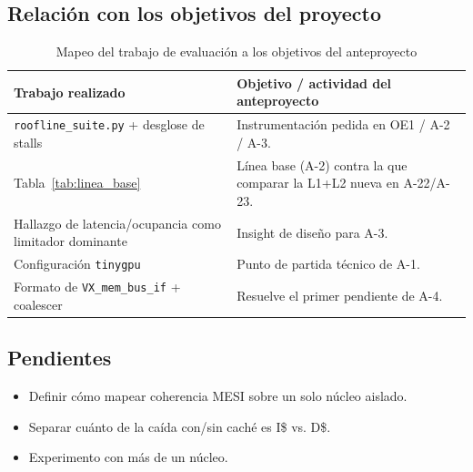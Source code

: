 \subsection{Relación con los objetivos del proyecto}

\begin{table}[H]
\centering
\begin{tabular}{|p{4.2cm}|p{9.3cm}|}
\hline
\textbf{Trabajo realizado} & \textbf{Objetivo / actividad del anteproyecto} \\
\hline
\texttt{roofline\_suite.py} + desglose de stalls &
Instrumentación pedida en OE1 / A-2 / A-3. \\
\hline
Tabla~\ref{tab:linea_base} &
Línea base (A-2) contra la que comparar la L1+L2 nueva en A-22/A-23. \\
\hline
Hallazgo de latencia/ocupancia como limitador dominante &
Insight de diseño para A-3. \\
\hline
Configuración \texttt{tinygpu} &
Punto de partida técnico de A-1. \\
\hline
Formato de \texttt{VX\_mem\_bus\_if} + coalescer &
Resuelve el primer pendiente de A-4. \\
\hline
\end{tabular}
\caption{Mapeo del trabajo de evaluación a los objetivos del anteproyecto}
\label{tab:mapeo_objetivos}
\end{table}

\subsection{Pendientes}

\begin{itemize}
    \item Definir cómo mapear coherencia MESI sobre un solo núcleo aislado.
    \item Separar cuánto de la caída con/sin caché es I\$ vs. D\$.
    \item Experimento con más de un núcleo.
\end{itemize}
